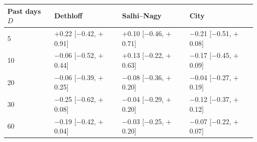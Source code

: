\begin{tabular}{llll}
\toprule
Past days $D$ & Dethloff & Salhi--Nagy & City \\
\midrule
5 & $+$0.22 [$-$0.42, $+$0.91] & $+$0.10 [$-$0.46, $+$0.71] & $-$0.21 [$-$0.51, $+$0.08] \\
10 & $-$0.06 [$-$0.52, $+$0.44] & $+$0.13 [$-$0.22, $+$0.63] & $-$0.17 [$-$0.45, $+$0.09] \\
20 & $-$0.06 [$-$0.39, $+$0.25] & $-$0.08 [$-$0.36, $+$0.20] & $-$0.04 [$-$0.27, $+$0.19] \\
30 & $-$0.25 [$-$0.62, $+$0.08] & $-$0.04 [$-$0.29, $+$0.20] & $-$0.12 [$-$0.37, $+$0.12] \\
60 & $-$0.19 [$-$0.42, $+$0.04] & $-$0.03 [$-$0.25, $+$0.20] & $-$0.07 [$-$0.22, $+$0.07] \\
\bottomrule
\end{tabular}
